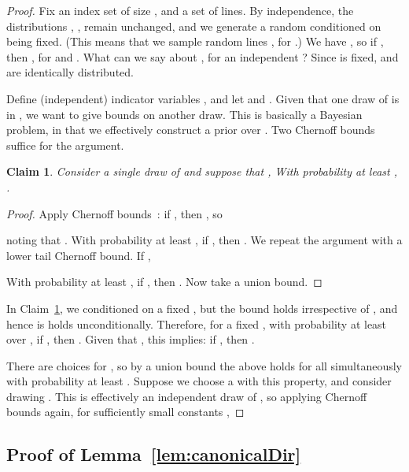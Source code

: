 \documentclass[letterpaper,11pt]{article}
\newtheorem{claim}[theorem]{Claim}
\begin{document}
\begin{proof} 
Fix an index set  of size ,
and a set 
of lines. By independence, the distributions
, , remain unchanged, 
and we generate a random 
 conditioned on  being fixed. 
(This means that we sample random 
lines , for .) 
We have 
, 
so if 
, 
then 
,
for  
and .
What can we say about 
, 
for an independent ? 
Since  is fixed,
 and 
 are 
identically distributed.

Define (independent) indicator variables 
, 
and let 
 and 
. 
Given that one draw of 
 is in , 
we want to give bounds on another draw.
This is basically a Bayesian problem, 
in that we effectively construct 
a prior over .
Two Chernoff bounds suffice 
for the argument. 

\begin{claim}\label{clm:cher} 
  Consider a single draw of 
   and suppose that 
  ,
  With probability at least 
  , 
  .
\end{claim}

\begin{proof} 
Apply Chernoff 
bounds~\cite[Theorem~1.1]{DubhashiPa09}:
if ,
then , so 

noting that 
.
With probability at least 
, if , 
then .
We repeat the argument with 
a lower tail Chernoff bound. 
If , 

With probability at least 
, if , 
then .
Now take a union bound.
\end{proof}

In Claim~\ref{clm:cher},
we conditioned on a fixed , 
but the bound holds irrespective 
of , and hence is
holds unconditionally. 
Therefore, for a fixed , 
with probability at least 
 over , if 
, then 
.
Given that , this 
implies: 
if ,  then
.

There are  choices for , 
so by a union bound 
the above holds for all  simultaneously
with probability at least . 
Suppose we choose a  with this property,
and consider drawing . 
This is effectively an independent draw of ,
so applying Chernoff bounds again, 
for sufficiently small constants 
,

\end{proof}

\subsection{Proof of Lemma~\ref{lem:canonicalDir}} 
\label{sec:canonicalDir}
\end{document}
